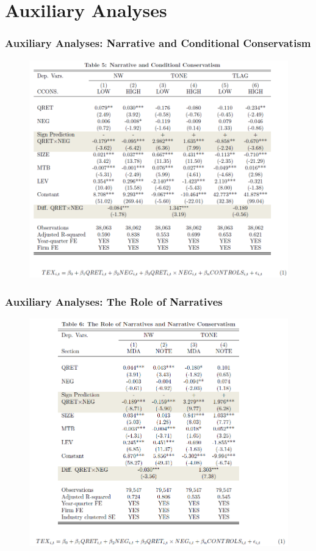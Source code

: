 \documentclass{beamer}
\begin{document}
\section{Auxiliary Analyses}
\begin{frame}
\frametitle{Auxiliary Analyses: Narrative and Conditional Conservatism}
	\begin{figure}[h]
	\centering
	\includegraphics[width=0.75\linewidth]{tab5}
	\label{tab5}
	\end{figure}
\end{frame}
\begin{frame}
\frametitle{Auxiliary Analyses: The Role of Narratives}
	\begin{figure}[h]
	\centering
	\includegraphics[width=0.70\linewidth]{tab6}
	\label{tab6}
	\end{figure}
	
\end{frame}
\end{document}
